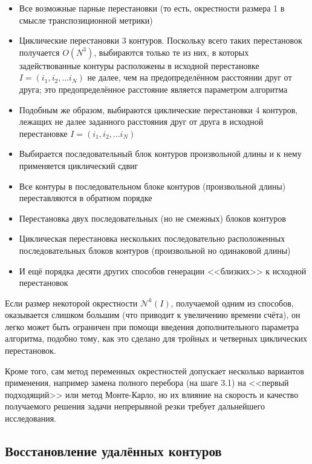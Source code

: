\documentclass[10pt]{SPIIRAS_Proceedings}
\begin{document}
\begin{itemize}
  \item
  Все возможные парные перестановки
  (то есть, окрестности размера 1 в смысле транспозиционной метрики)
  \item
  Циклические перестановки 3 контуров.
  Поскольку всего таких перестановок получается
  $O (N ^ 3)$,
  выбираются только те из них,
  в которых задействованные контуры расположены
  в исходной перестановке
  $I = (i_1, i_2, ... i_N)$
  не далее, чем на предопределённом расстоянии
  друг от друга;
  это предопределённое расстояние является
  параметром алгоритма
  \item
  Подобным же образом,
  выбираются циклические перестановки 4 контуров,
  лежащих не далее заданного расстояния
  друг от друга в исходной перестановке
  $I = (i_1, i_2, ... i_N)$
  \item
  Выбирается последовательный блок контуров
  произвольной длины и к нему применяется
  циклический сдвиг
  \item
  Все контуры в последовательном блоке
  контуров
  (произвольной длины)
  переставляются в обратном порядке
  \item
  Перестановка двух последовательных
  (но не смежных) блоков контуров
  \item
  Циклическая перестановка нескольких
  последовательно расположенных
  последовательных блоков контуров
  (произвольной но одинаковой длины)
  \item
  И ещё порядка десяти других способов генерации
  <<близких>> к исходной перестановок
\end{itemize}

Если размер некоторой окрестности
$\mathcal N^k(I)$,
получаемой одним из способов,
оказывается слишком большим
(что приводит к увеличению времени счёта),
он легко может быть ограничен
при помощи введения дополнительного параметра
алгоритма,
подобно тому,
как это сделано для тройных
и четверных циклических перестановок.

Кроме того,
сам метод переменных окрестностей
допускает несколько вариантов применения,
например замена полного перебора
(на шаге 3.1)
на <<первый подходящий>>
или метод Монте-Карло,
но их влияние на скорость
и качество получаемого решения
задачи непрерывной резки
требует дальнейшего исследования.

\subsection{Восстановление удалённых контуров}
\end{document}
